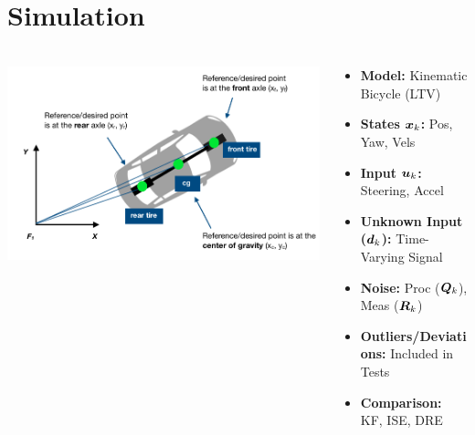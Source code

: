 \documentclass[handout, aspectratio=169]{beamer}
\begin{document}
\section{Simulation} %
\begin{frame}[fragile] %
    \frametitle{} %
    \begin{columns}[T] %

       \begin{column}{0.6\textwidth} %
            \begin{center}
                 \includegraphics[width=\textwidth]{figs/kinematics.png}                 
            \end{center}
       \end{column}

        \begin{column}{0.45\textwidth} %
            \begin{tcolorbox}[colbacktitle=title1, title=\textbf{Simulation Settings}]
                \begin{itemize}
                    \item<2-> \textbf{Model:} Kinematic Bicycle (LTV) \pause
                    \item<3-> \textbf{States ${\bm{x}}_k$:} Pos, Yaw, Vels \pause
                    \item<4-> \textbf{Input ${\bm{u}}_k$:} Steering, Accel \pause
                    \item<5-> \textbf{Unknown Input (${\bm{d}}_k$):} Time-Varying Signal \pause
                    \item<6-> \textbf{Noise:} Proc (${\bm{Q}}_k$), Meas (${\bm{R}}_k$)   \pause
                    \item<7-> \textbf{Outliers/Deviations:} Included in Tests \pause
                    \item<8->  \textbf{Comparison:} KF, ISE, DRE \pause
                \end{itemize}
            \end{tcolorbox}
       \end{column}
    \end{columns}
\end{frame}
\end{document}
